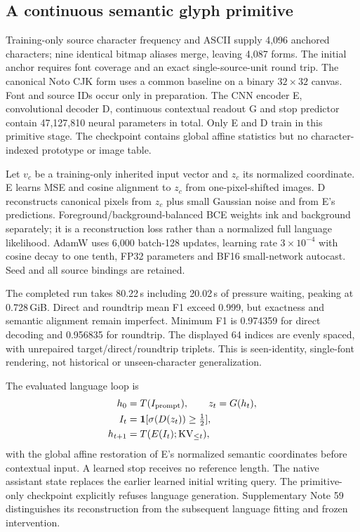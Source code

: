 \documentclass[10pt,a4paper]{article}
\begin{document}
\subsection*{A continuous semantic glyph primitive}
Training-only source character frequency and ASCII supply 4,096 anchored
characters; nine identical bitmap aliases merge, leaving 4,087 forms. The
initial anchor requires font coverage and an exact single-source-unit round
trip. The canonical Noto CJK form uses a common baseline on a binary
$32\times32$ canvas. Font and source IDs occur only in preparation.
The CNN encoder E, convolutional decoder D, continuous contextual readout G
and stop predictor contain 47,127,810 neural parameters in total. Only E and
D train in this primitive stage. The checkpoint contains global affine
statistics but no character-indexed prototype or image table.

Let $v_c$ be a training-only inherited input vector and $z_c$ its normalized
coordinate. E learns MSE and cosine alignment to $z_c$ from one-pixel-shifted
images. D reconstructs canonical pixels from $z_c$ plus small Gaussian noise
and from E's predictions. Foreground/background-balanced BCE weights ink
and background separately; it is a reconstruction loss rather than a
normalized full language likelihood. AdamW uses 6,000 batch-128 updates,
learning rate $3\times10^{-4}$ with cosine decay to one tenth, FP32 parameters
and BF16 small-network autocast. Seed and all source bindings are retained.

The completed run takes 80.22\,s including 20.02\,s of pressure waiting,
peaking at 0.728\,GiB. Direct and roundtrip mean F1 exceed 0.999, but exactness
and semantic alignment remain imperfect. Minimum F1 is 0.974359 for direct
decoding and 0.956835 for roundtrip. The displayed 64 indices are evenly
spaced, with unrepaired target/direct/roundtrip triplets. This is seen-identity,
single-font rendering, not historical or unseen-character generalization.

The evaluated language loop is
\begin{align*}
h_0&=T(I_{\rm prompt}),\qquad z_t=G(h_t),\\
I_t&={\bf1}[\sigma(D(z_t))\geq\tfrac12],\\
h_{t+1}&=T(E(I_t);\mathrm{KV}_{\leq t}),
\end{align*}
with the global affine restoration of E's normalized semantic coordinates
before contextual input. A learned stop receives no reference length. The
native assistant state replaces the earlier learned initial writing query.
The primitive-only checkpoint explicitly refuses language generation.
Supplementary Note 59 distinguishes its reconstruction from the subsequent
language fitting and frozen intervention.
\end{document}
